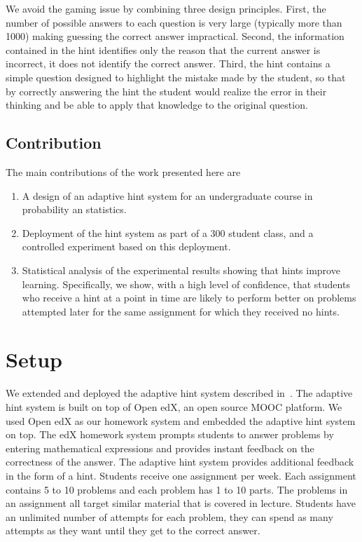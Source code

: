 \documentclass{llncs2e/llncs}
\begin{document}
We avoid the gaming issue by combining three design principles. First, the number of possible answers to each question is very large (typically more than 1000) making guessing the correct answer impractical.  Second, the information contained in the hint
identifies only the reason that the current answer is incorrect, it does not identify the correct answer. Third, the hint contains a
simple question designed to highlight the mistake made by the student, so that by correctly answering the hint the student would realize the error in their thinking and be able to apply that knowledge to the original question.


\subsection*{Contribution}

The main contributions of the work presented here are
\begin{enumerate}
\item
A design of an adaptive hint system for an undergraduate course in probability an statistics.
\item
Deployment of the hint system as part of a 300 student class, and a controlled experiment based on this deployment.
\item
Statistical analysis of the experimental results showing that hints improve learning. Specifically, we show, with a high level of confidence, that students who receive a hint at a point in time are likely to perform better on problems attempted later for the same assignment for which they received no hints.
\end{enumerate}

\section{Setup}

We extended and deployed the adaptive hint system described in~\cite{ElkherjFreund14}.  The adaptive hint system is built on top of Open edX, an open source MOOC platform. We used Open edX as our homework system and embedded the adaptive hint system on top. The edX homework system prompts students to answer problems by entering mathematical expressions and provides instant feedback on the correctness of the answer. The adaptive hint system provides additional feedback in the form of a hint. Students receive one assignment per week. Each assignment contains 5 to 10 problems and each problem has 1 to 10 parts. The problems in an assignment all target similar material that is covered in lecture. Students have an unlimited number of attempts for each problem, they can spend as many attempts as they want until they get to the correct answer.
\end{document}
